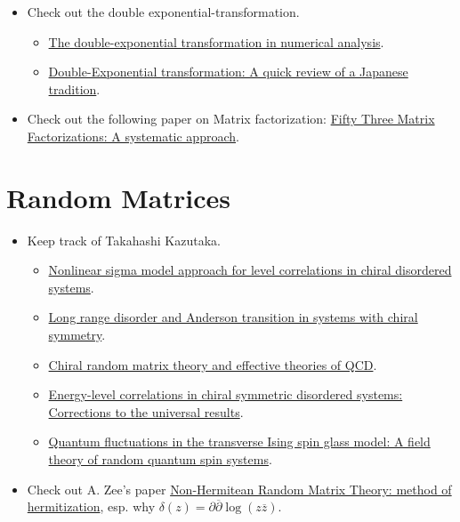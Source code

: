 \documentclass{article}
\begin{document}
\begin{itemize}
    \item Check out the double exponential-transformation.
    \begin{itemize}
        \item \href{https://core.ac.uk/download/pdf/82080804.pdf}{The double-exponential transformation in numerical analysis}.
        \item \href{https://arxiv.org/pdf/2301.01920.pdf}{Double-Exponential transformation:
        A quick review of a Japanese tradition}.
    \end{itemize}
    \item Check out the following paper on Matrix factorization:
    \href{https://arxiv.org/pdf/2104.08669.pdf}{Fifty Three Matrix Factorizations: A systematic approach}.
\end{itemize}

\section{Random Matrices}

\begin{itemize}
    \item Keep track of Takahashi Kazutaka.
    \begin{itemize}
        \item \href{https://arxiv.org/abs/cond-mat/0403284}{Nonlinear sigma model approach for level correlations in chiral disordered systems}.
        \item \href{https://arxiv.org/abs/cond-mat/0403557}{Long range disorder and Anderson transition in systems with chiral symmetry}.
        \item \href{https://www.sciencedirect.com/science/article/pii/S0375947400000695?via%3Dihub}{Chiral random matrix theory and effective theories of QCD}.
        \item \href{https://arxiv.org/pdf/cond-mat/0011003.pdf}{Energy-level correlations in chiral symmetric disordered systems: Corrections to the universal results}.
        \item \href{https://journals.aps.org/prb/pdf/10.1103/PhysRevB.76.184422}{Quantum fluctuations in the transverse Ising spin glass model: A field theory of random quantum spin systems}.
    \end{itemize}
    \item Check out A. Zee's paper \href{https://arxiv.org/pdf/cond-mat/9703087.pdf}{Non-Hermitean Random Matrix Theory: method of hermitization}, esp. why $\delta(z)=\partial \overline{\partial}\log(z\overline{z})$.
\end{itemize}
\end{document}
